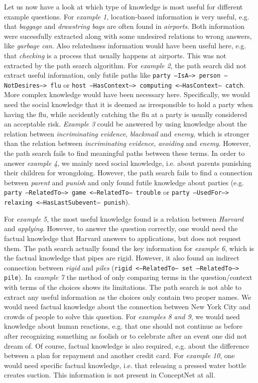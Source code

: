 \documentclass{article}
\begin{document}
Let us now have a look at which type of knowledge is most useful for
different example questions. For \emph{example 1}, location-based
information is very useful, e.g. that \emph{baggage} and
\emph{drawstring bags} are often found in \emph{airports}. Both
information were sucessfully extracted along with some undesired
relations to wrong answers, like \emph{garbage can}. Also relatedness
information would have been useful here, e.g. that \emph{checking} is
a process that usually happens at airports. This was not extracted by
the path search algorithm. For \emph{example 2}, the path search did
not extract useful information, only futile paths like \texttt{party
  --IsA--> person --NotDesires--> flu} or \texttt{host --HasContext-->
  computing <--HasContext-- catch}. More complex knowledge would have
been necessary here. Specifically, we would need the social knowledge
that it is deemed as irresponsible to hold a party when having the
flu, while accidently catching the flu at a party is usually
considered an acceptable risk.  \emph{Example 3} could be answered by
using knowledge about the relation between \emph{incriminating
  evidence}, \emph{blackmail} and \emph{enemy}, which is stronger than
the relation between \emph{incriminating evidence}, \emph{avoiding}
and \emph{enemy}. However, the path search fails to find meaningful
paths between these terms. In order to answer \emph{example 4}, we
mainly need social knowledge, i.e. about parents punishing their
children for wrongdoing. However, the path search fails to find a
connection between \emph{parent} and \emph{punish} and only found
futile knowledge about parties (e.g. \texttt{party --RelatedTo--> game
  <--RelatedTo-- trouble} or \texttt{party --UsedFor--> relaxing
  <--HasLastSubevent-- punish}).

For \emph{example 5}, the most useful knowledge found is a relation
between \emph{Harvard} and \emph{applying}. However, to answer the
question correctly, one would need the factual knowledge that Harvard
answers to applications, but does not request them. The path search
actually found the key information for \emph{example 6}, which is the
factual knowledge that pipes are rigid. However, it also found an
indirect connection between \emph{rigid} and \emph{piles}
(\texttt{rigid <--RelatedTo-- set --RelatedTo--> pile}). In
\emph{example 7} the method of only comparing terms in the
question/context with terms of the choices shows its limitations.  The
path search is not able to extract any useful information as the
choices only contain two proper names. We would need factual knowledge
about the connection between New York City and crowds of people to
solve this question.  For \emph{examples 8 and 9}, we would need
knowledge about human reactions, e.g. that one should not continue as
before after recognizing something as foolish or to celebrate after an
event one did not dream of. Of course, factual knowledge is also
required, e.g. about the difference between a plan for repayment and
another credit card.  For \emph{example 10}, one would need specific
factual knowledge, i.e. that releasing a pressed water bottle creates
suction. This information is  not present in ConceptNet at all.
\end{document}
